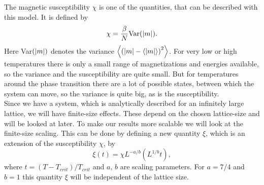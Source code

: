 The magnetic susceptibility $\chi$ is one of the quantities, that can be described with this model. It is defined by
\begin{equation}
 \chi = \frac{\beta}{N} \text{Var}(\left\vert m \right\vert).\label{eq:suscep}
\end{equation}
Here Var$(\left\vert m \right\vert)$ denotes the variance $\left\langle{(\left\vert m \right\vert - \left\langle\left\vert m \right\vert\right\rangle)} ^2\right\rangle$. For very low or high temperatures there is only a small range of magnetizations and energies available, so the variance and the susceptibility are quite small. But for temperatures around the phase transition there are a lot of possible states, between which the system can move, so the variance is quite big, as is the susceptibility.\\

Since we have a system, which is analytically described for an infinitely large lattice, we will have finite-size effects. These depend on the chosen lattice-size and will be looked at later. To make our results more scalable we will look at the finite-size scaling. This can be done by defining a new quantity $\xi$, which is an extension of the susceptibility $\chi$, by
\begin{equation}
  \xi(t) = \chi L^{-a/b} (L^{1/b} t),
\end{equation}
where $t = (T - T_{crit})/T_{crit}$ and $a$, $b$ are scaling parameters. For $a = 7/4$ and $b = 1$ this quantity $\xi$ will be independent of the lattice size.
